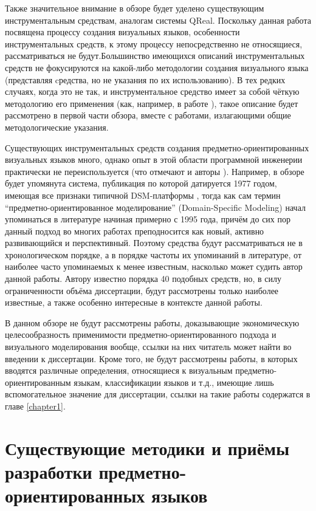 Также значительное внимание в обзоре будет уделено существующим инструментальным средствам, 
аналогам системы QReal. Поскольку данная работа посвящена процессу создания визуальных 
языков, особенности инструментальных средств, к этому процессу непосредственно не 
относящиеся, рассматриваться не будут.Большинство имеющихся описаний инструментальных средств 
не фокусируются на какой-либо методологии создания визуального языка (представляя 
cредства, но не указания по их использованию). В тех редких случаях, когда это не так, 
и инструментальное средство имеет за собой чёткую методологию его применения (как, 
например, в работе \cite{repenning1995agentsheets}), такое описание будет рассмотрено в 
первой части обзора, вместе с работами, излагающими общие методологические указания.

Существующих инструментальных средств создания предметно-ориентированных визуальных 
языков много, однако опыт в этой области программной инженерии практически не переиспользуется 
(что отмечают и авторы \cite{kelly2008domain}). Например, в обзоре будет упомянута 
система, публикация по которой датируется 1977 годом, имеющая все признаки типичной 
DSM-платформы \cite{teichroew1977psl}, тогда как сам термин "`предметно-ориентированное 
моделирование"' (Domain-Specific Modeling) начал упоминаться в литературе начиная примерно с 
1995 года, 
причём до сих пор данный подход во многих работах преподносится как новый, активно 
развивающийся и перспективный. Поэтому средства будут рассматриваться не в хронологическом 
порядке, а в порядке частоты их упоминаний в литературе, от наиболее часто упоминаемых к менее 
известным, насколько может судить автор данной работы. Автору известно порядка 40 подобных
средств, но, в силу ограниченности объёма диссертации, будут рассмотрены только наиболее 
известные, а также особенно интересные в контексте данной работы.

В данном обзоре не будут рассмотрены работы, доказывающие экономическую целесообразность
применимости предметно-ориентированного подхода и визуального моделирования вообще,
ссылки на них читатель может найти во введении к диссертации. Кроме того, не будут
рассмотрены работы, в которых вводятся различные определения, относящиеся к визуальным
предметно-ориентированным языкам, классификации языков и т.д., имеющие лишь вспомогательное
значение для диссертации, ссылки на такие работы содержатся в главе \ref{chapter1}.

\section{Существующие методики и приёмы разработки предметно-ориентированных языков}

